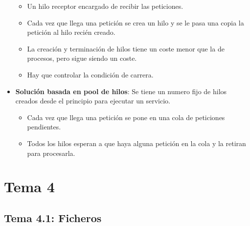 \documentclass[12pt, twoside, openright]{report} %
\begin{document}
\begin{itemize}
    \begin{itemize}
    \item Un hilo receptor encargado de recibir las peticiones.
      
    \item Cada vez que llega una petición se crea un hilo y se le pasa una
      copia la petición al hilo recién creado.
      
    \item La creación y terminación de hilos tiene un coste menor que la de
      procesos, pero sigue siendo un coste.
      
    \item Hay que controlar la condición de carrera.
      
    \end{itemize}
  \item \textbf{Solución basada en pool de hilos}: Se tiene un numero fijo
    de hilos creados desde el principio para ejecutar un servicio.
    

    \begin{itemize}
    \item Cada vez que llega una petición se pone en una cola de peticiones
      pendientes.
      
    \item Todos los hilos esperan a que haya alguna petición en la cola y la
      retiran para procesarla.
      
    \end{itemize}
  \end{itemize}

\chapter{Tema 4}

  \section{Tema 4.1: Ficheros}
\end{document}
